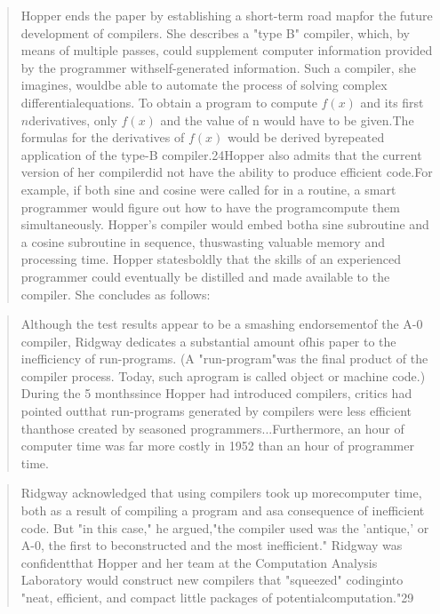 \begin{quotation}
Hopper ends the paper by establishing a short-term road mapfor the future development of compilers. She describes a "type B" compiler, which, by means of multiple passes, could supplement computer information provided by the programmer withself-generated information. Such a compiler, she imagines, wouldbe able to automate the process of solving complex differentialequations. To obtain a program to compute $f(x)$ and its first $n$derivatives, only $f(x)$ and the value of n would have to be given.The formulas for the derivatives of $f(x)$ would be derived byrepeated application of the type-B compiler.24Hopper also admits that the current version of her compilerdid not have the ability to produce efficient code.For example, if both sine and cosine were called for in a routine,
a smart programmer would figure out how to have the programcompute them simultaneously. Hopper's compiler would embed botha sine subroutine and a cosine subroutine in sequence, thuswasting valuable memory and processing time. Hopper statesboldly that the skills of an experienced programmer could eventually be distilled and made available to the compiler. She concludes as follows:\end{quotation}
\begin{quotation}
Although the test results appear to be a smashing endorsementof the A-0 compiler, Ridgway dedicates a substantial amount ofhis paper to the inefficiency of run-programs. (A "run-program"was the final product of the compiler process. Today, such aprogram is called object or machine code.) During the 5 monthssince Hopper had introduced compilers, critics had pointed outthat run-programs generated by compilers were less efficient thanthose created by seasoned programmers...Furthermore, an hour of computer time was far more costly in 1952 than an hour of programmer time.\end{quotation}
\begin{quotation}
Ridgway acknowledged that using compilers took up morecomputer time, both as a result of compiling a program and asa consequence of inefficient code. But "in this case," he argued,"the compiler used was the 'antique,' or A-0, the first to beconstructed and the most inefficient." Ridgway was confidentthat Hopper and her team at the Computation Analysis Laboratory would construct new compilers that "squeezed" codinginto "neat, efficient, and compact little packages of potentialcomputation."29\end{quotation}

